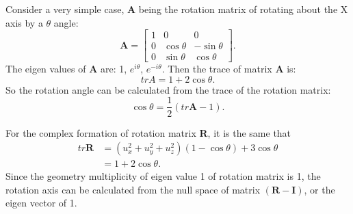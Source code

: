 \documentclass{article}
\begin{document}
Consider a very simple case, \textbf{A} being the rotation matrix of rotating about the X axis by a $\theta$ angle:
\begin{displaymath}
\mathbf{A} = \begin{bmatrix}
1 & 0 & 0 \\
0 & \cos{\theta} & -\sin{\theta} \\
0 & \sin{\theta} & \cos{\theta}
\end{bmatrix}.
\end{displaymath}
The eigen values of \textbf{A} are: 1, $e^{i\theta}$, $e^{-i\theta}$. Then the trace of matrix \textbf{A} is:
\begin{displaymath}
tr{A} = 1+2\cos{\theta}.
\end{displaymath}
So the rotation angle can be calculated from the trace of the rotation matrix:
\begin{displaymath}
\cos{\theta} = \frac{1}{2}(tr\mathbf{A}-1).
\end{displaymath}

For the complex formation of rotation matrix \textbf{R}, it is the same that
\begin{displaymath}
\begin{split}
tr\mathbf{R} &= (u_x^2+u_y^2+u_z^2)(1-\cos{\theta})+3\cos{\theta} \\
 &= 1+2\cos{\theta}.
\end{split}
\end{displaymath}
Since the geometry multiplicity of eigen value 1 of rotation matrix is 1, the rotation axis can be calculated from the null space of matrix $(\mathbf{R}-\mathbf{I})$, or the eigen vector of 1.
\end{document}
